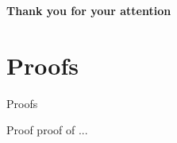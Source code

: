 \documentclass{beamer}
\begin{document}
\begin{frame}[plain]
  \titlepage
  
\end{frame}






\begin{frame}
  \centering
  \vfill
  {\LARGE\bfseries Thank you for your attention}
  \vfill
\end{frame}


\appendix



\section{Proofs}

\begin{frame}{Proofs}
  \begin{block}{Proof}
    proof of ...
  \end{block}
\end{frame}
\end{document}
